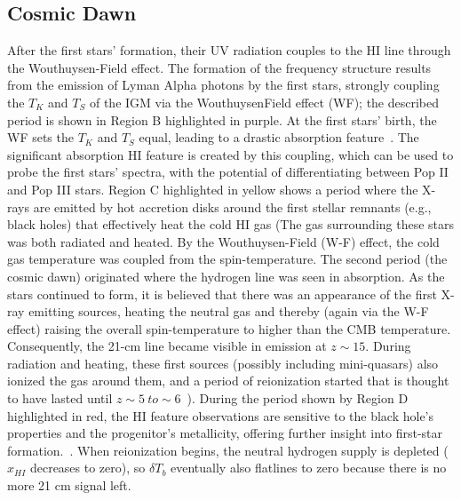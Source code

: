 	\subsection{Cosmic Dawn}
	    
	    After the first stars' formation, their UV radiation couples to the HI line through the Wouthuysen-Field effect. The formation of the frequency structure results from the emission of Lyman Alpha photons by the first stars, strongly coupling the $T_K$ and $T_S$ of the IGM via the WouthuysenField effect (WF); the described period is shown in Region B highlighted in purple. At the first stars' birth, the WF sets the $ T_K $ and $ T_S $ equal, leading to a drastic absorption feature~\citep{2014ApJ...782L...9V}. The significant absorption HI feature is created by this coupling, which can be used to probe the first stars' spectra, with the potential of differentiating between Pop II and Pop III stars. Region C highlighted in yellow shows a period where the X-rays are emitted by hot accretion disks around the first stellar remnants (e.g., black holes) that effectively heat the cold HI gas (The gas surrounding these stars was both radiated and heated. By the Wouthuysen-Field (W-F) effect, the cold gas temperature was coupled from the spin-temperature. The second period (the cosmic dawn)  originated where the hydrogen line was seen in absorption. As the stars continued to form, it is believed that there was an appearance of the first X-ray emitting sources, heating the neutral gas and thereby (again via the W-F effect) raising the overall spin-temperature to higher than the CMB temperature.\\
	    
	    
	    Consequently, the 21-cm line became visible in emission at $z\sim15$. During radiation and heating, these first sources (possibly including mini-quasars) also ionized the gas around them, and a period of reionization started that is thought to have lasted until $z\sim5~to\sim 6$~\citep{2015aska.confE...1K}). During the period shown by Region D highlighted in red, the HI feature observations are sensitive to the black hole's properties and the progenitor's metallicity, offering further insight into first-star formation.~\citep{11}. When reionization begins, the neutral hydrogen supply is depleted ($x_{HI}$ decreases to zero), so $\delta T_b$ eventually also flatlines to zero because there is no more 21 cm signal left. \\ 
	    
